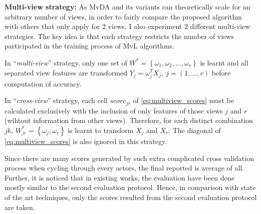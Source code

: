     \textbf{Multi-view strategy:} As MvDA and its variants can theoretically scale for an arbitrary number of views, in order to fairly compare the proposed algorithm with others that only apply for 2 views, I also experiment 2 different multi-view strategies. The key idea is that each strategy restricts the number of views participated in the training process of MvL algorithms.

    In ``\emph{multi-view}'' strategy, only one set of $W^*=\left\{{\omega}_1, {\omega}_2, ..., {\omega}_v\right\}$ is learnt and all separated view features are transformed $Y_j=\omega_j^TX_j,\ j=(1,...,v)$ before computation of accuracy.

    In ``\emph{cross-view}'' strategy, each cell ${score}_{jr}$ of \eqref{eq:multiview_scores} must be calculated exclusively with the inclusion of only features of those views $j$ and $r$ (wihtout information from other views).
    Therefore, for each distinct combination $jk$, $W_{jr}^*=\left\{{\omega}_j, {\omega}_r\right\}$ is learnt to transform $X_j$ and $X_r$. The diagonal of \eqref{eq:multiview_scores} is also ignored in this strategy.

    Since there are many scores generated by such extra complicated cross validation process when cycling through every actors, the final reported is average of all.
    Further, it is noticed that in existing works, the evaluation have been done mostly similar to the second evaluation protocol. Hence, in comparison with state of the art techniques, only the scores resulted from the second evaluation protocol are taken.
